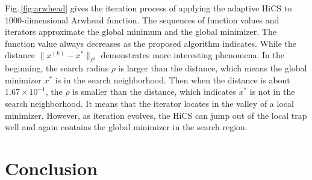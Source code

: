\documentclass[mathpazo]{csam}
\theoremstyle{remark}
\newcommand{\Note}[1]{{\color{blue}{#1}}} %
\begin{document}
Fig.\,\ref{fig:arwhead} gives the iteration process of
applying the adaptive HiCS to $1000$-dimensional Arwhead function.
The sequences of function values and iterators approximate the global minimum
and the global minimizer. 
The function value always decreases as the proposed algorithm
indicates. While the distance $\|x^{(k)}-x^*\|_{\ell^2}$
demonstrates more interesting phenomena. In the beginning, the
search radius $\rho$ is larger than the distance, which means the global
minimizer $x^*$ is in the search neighborhood. Then when the distance is
about $1.67\times 10^{-1}$, the $\rho$ is smaller than the
distance, which indicates $x^*$ is not in the search neighborhood. 
It means that the iterator locates in the valley of a local minimizer. 
However, as iteration evolves, the HiCS can jump out of
the local trap well and again contains the global
minimizer in the search region.



\section{Conclusion}
\label{sec:conclusion}

\Note{
In this paper, we introduce a new concept of the SMP to measure the distance between
minimizers and the SMP. We prove that the HiCS converges to a SMP in finite steps. 
To address high dimensional problems, 
we propose an efficient method to discretize subproblem through simplexes in which
the discretization points linearly increase with the spatial dimension.
We apply this HiCS to several benchmarks to examine its performance.
Numerical results demonstrate that the HiCS can efficiently obtain a small
neighbourhood that includes local minimizers, even the global minimizer. 
The obtained results by the HiCS provide a good initial values for other optimization
methods to further find a minimizer. Alternatively, we here shrink the search
radius to directly approximate a minimizer by the HiCS.
}


\end{document}
